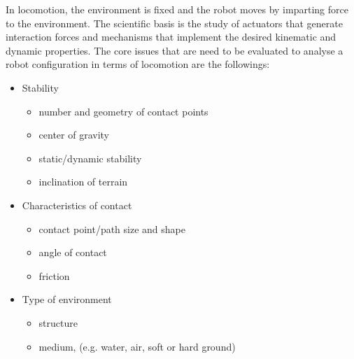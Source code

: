 \documentclass[12pt,english]{article}
\begin{document}
In locomotion, the environment is fixed and the robot moves by imparting force to the environment. The scientific basis is the study of actuators that generate interaction forces and mechanisms that implement the desired kinematic and dynamic properties. The core issues that are need to be evaluated to analyse a robot configuration in terms of locomotion are the followings:
\begin{itemize}
	\item Stability
		\begin{itemize}
			\item number and geometry of contact points
			\item center of gravity
			\item static/dynamic stability
			\item inclination of terrain
		\end{itemize}
	\item Characteristics of contact
		\begin{itemize}
			\item contact point/path size and shape
			\item angle of contact
			\item friction
		\end{itemize}
	\item Type of environment
	\begin{itemize}
		\item structure
		\item medium, (e.g. water, air, soft or hard ground)
	\end{itemize}

\end{itemize}











\end{document}
